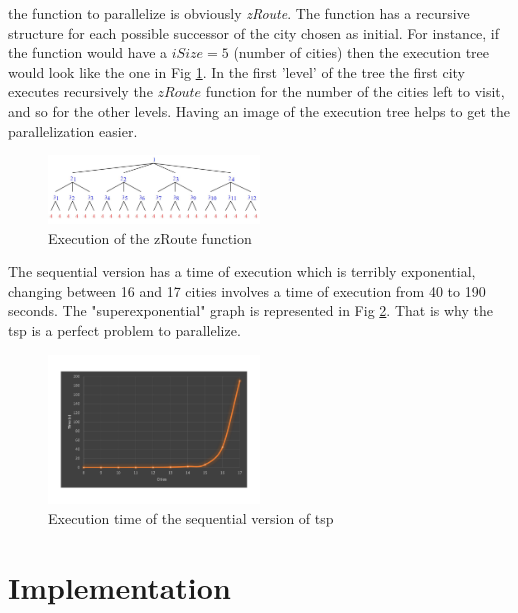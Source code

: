 \documentclass[11pt,conference]{IEEEtran}
\begin{document}
the function to parallelize is obviously \textit{zRoute}.
\newline
The function has a recursive structure for each possible successor of the city chosen as initial. For instance, if the function would have a $iSize = 5$ (number of cities) then the execution tree would look like the one in Fig \ref{fig:tree}. 
In the first 'level' of the tree the first city executes recursively the $zRoute$ function for the number of the cities left to visit, and so for the other levels.
Having an image of the execution tree helps to get the parallelization easier.
\begin{figure}[h!]
  \centering
    \includegraphics[width=0.5\textwidth]{tree}
    \caption{Execution of the zRoute function}
    \label{fig:tree}
\end{figure}
\newline
The sequential version has a time of execution which is terribly exponential, changing between 16 and 17 cities involves a time of execution from 40 to 190 seconds. The "superexponential" graph is represented in Fig \ref{fig:node-scaling-seq}.
That is why the tsp is a perfect problem to parallelize.
\begin{figure}[h!]
  \centering
    \includegraphics[trim=0.0cm 3.5cm 0.0cm 3.5cm, width=0.5\textwidth]{node-scaling-seq}
    \caption{Execution time of the sequential version of tsp}
    \label{fig:node-scaling-seq}
\end{figure}
\section{Implementation}
\end{document}
